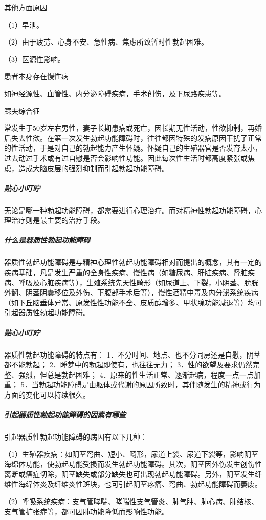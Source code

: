 其他方面原因

（1）早泄。

（2）由于疲劳、心身不安、急性病、焦虑所致暂时性勃起困难。

（3）医源性影响。

患者本身存在慢性病

如神经源性、血管性、内分泌障碍疾病，手术创伤，及下尿路疾患等。

鳏夫综合征

常发生于50岁左右男性，妻子长期患病或死亡，因长期无性活动，性欲抑制，再婚后失去性欲。在第一次发生勃起功能障碍时，往往都因特殊的发病原因干扰了正常的性活动，于是对自己的勃起能力产生怀疑。怀疑自己的生殖器官是否发育太小，过去动过手术或有过自慰是否会影响性功能。因此每次性生活时都高度紧张或焦虑，造成大脑皮层的强烈抑制而引起勃起功能障碍。

\subparagraph{贴心小叮咛}

无论是哪一种勃起功能障碍，都需要进行心理治疗。而对精神性勃起功能障碍，心理治疗则是最主要的治疗手段。

\subparagraph{什么是器质性勃起功能障碍}

器质性勃起功能障碍是与精神心理性勃起功能障碍相对而提出的概念，其有一定的疾病基础，凡是发生严重的全身性疾病、慢性病（如糖尿病、肝脏疾病、肾脏疾病、呼吸及心脏疾病等），生殖系统先天性畸形（如尿道上、下裂，小阴茎、膀胱外翻、阴茎阴囊移位及外伤、下腹部手术后等），慢性酒精中毒及内分泌系统疾病（如下丘脑垂体异常、原发性性功能不全、皮质醇增多、甲状腺功能减退等）均可引起器质性勃起功能障碍。

\subparagraph{贴心小叮咛}

器质性勃起功能障碍的特点有：
1．不分时间、地点、也不分同房还是自慰，阴茎都不能勃起；
2．睡梦中的勃起即使有，也往往无力；
3．性的欲望及要求仍然完整、强烈，但总是勃起困难；
4．原来的性生活正常、逐渐起病，程度一点一点加重；
5．当勃起功能障碍是由躯体或代谢的原因所致时，其伴随发生的精神或行为方面的变化可以持续很久。

\subparagraph{引起器质性勃起功能障碍的因素有哪些}

引起器质性勃起功能障碍的病因有以下几种：

（1）生殖器疾病：如阴茎弯曲、短小、畸形，尿道上裂、尿道下裂等，影响阴茎海绵体功能，使勃起功能受损而发生勃起功能障碍。其次，阴茎因外伤发生创伤性离断或癌症切除，阴茎缺失或部分缺失也可出现勃起功能障碍。另外，阴茎发生纤维性海绵体炎及纤维炎性斑块，也可引起阴茎疼痛、弯曲、勃起功能障碍而萎废。

（2）呼吸系统疾病：支气管哮喘、哮喘性支气管炎、肺气肿、肺心病、肺结核、支气管扩张症等，都可因肺功能降低而影响性功能。

